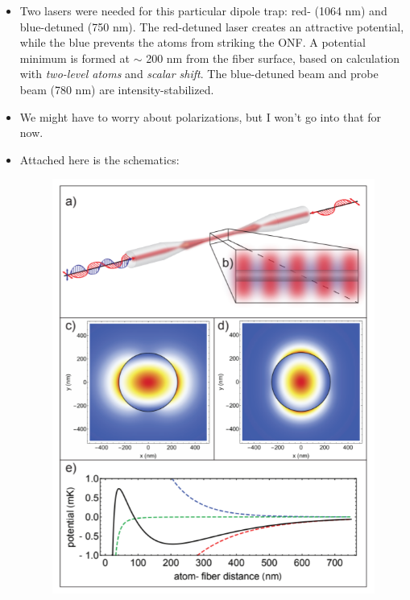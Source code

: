 \documentclass{report}
\theoremstyle{definition}
\begin{document}
\begin{itemize}
\begin{itemize}
		\item Two lasers were needed for this particular dipole trap: red- (1064 nm) and blue-detuned (750 nm). The red-detuned laser creates an attractive potential, while the blue prevents the atoms from striking the ONF. A potential minimum is formed at $\sim$ 200 nm from the fiber surface, based on calculation with \textit{two-level atoms} and \textit{scalar shift}. The blue-detuned beam and probe beam (780 nm) are intensity-stabilized. 
		
		\item We might have to worry about polarizations, but I won't go into that for now.
		
		\item Attached here is the schematics:
		\begin{figure}[!htb]
			\centering
			\includegraphics[scale=0.9]{dipole-trap}
		\end{figure}
	

\end{itemize}
\end{itemize}
\end{document}

